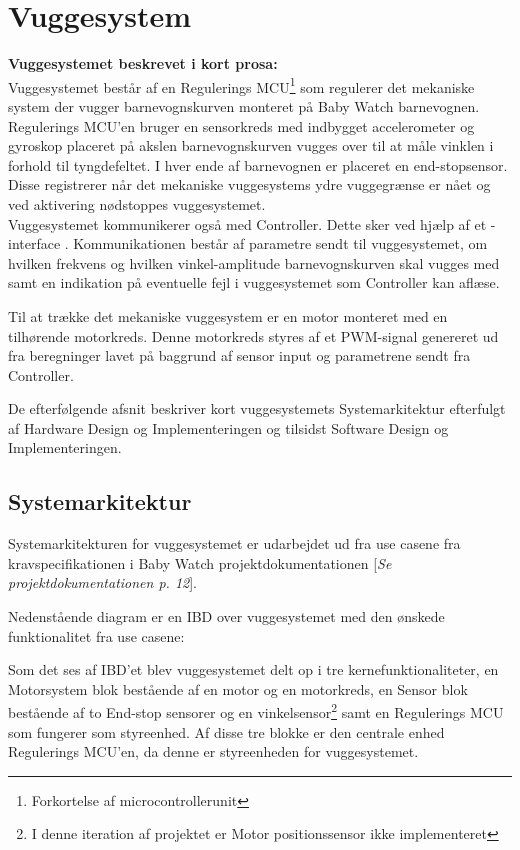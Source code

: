 \chapter{Vuggesystem}
\label{vuggesys}
\textbf{Vuggesystemet beskrevet i kort prosa:} \\
Vuggesystemet består af en Regulerings MCU\footnote{Forkortelse af microcontrollerunit} som regulerer det mekaniske system der vugger barnevognskurven monteret på Baby Watch barnevognen. \\ Regulerings MCU'en bruger en sensorkreds med indbygget accelerometer og gyroskop placeret på akslen barnevognskurven vugges over til at måle vinklen i forhold til tyngdefeltet. I hver ende af barnevognen er placeret en end-stopsensor. Disse registrerer når det mekaniske vuggesystems ydre vuggegrænse er nået og ved aktivering nødstoppes vuggesystemet. \\ Vuggesystemet kommunikerer også med Controller. Dette sker ved hjælp af et \iic-interface \citep{I2C}. Kommunikationen består af parametre sendt til vuggesystemet, om hvilken frekvens og hvilken vinkel-amplitude barnevognskurven skal vugges med samt en indikation på eventuelle fejl i vuggesystemet som Controller kan aflæse.

Til at trække det mekaniske vuggesystem er en motor monteret med en tilhørende motorkreds. Denne motorkreds styres af et PWM-signal genereret ud fra beregninger lavet på baggrund af sensor input og parametrene sendt fra Controller.

De efterfølgende afsnit beskriver kort vuggesystemets Systemarkitektur efterfulgt af Hardware Design og Implementeringen og tilsidst Software Design og Implementeringen.
\newpage
\section{Systemarkitektur}
\label{vs_sysark}
Systemarkitekturen for vuggesystemet er udarbejdet ud fra use casene fra kravspecifikationen i Baby Watch projektdokumentationen [\textit{Se projektdokumentationen p. 12}].

Nedenstående diagram er en IBD over vuggesystemet med den ønskede funktionalitet fra use casene:


Som det ses af IBD'et blev vuggesystemet delt op i tre kernefunktionaliteter, en Motorsystem blok bestående af en motor og en motorkreds, en Sensor blok bestående af to End-stop sensorer og en vinkelsensor\footnote{I denne iteration af projektet er Motor positionssensor ikke implementeret} samt en Regulerings MCU som fungerer som styreenhed. Af disse tre blokke er den centrale enhed Regulerings MCU'en, da denne er styreenheden for vuggesystemet.

